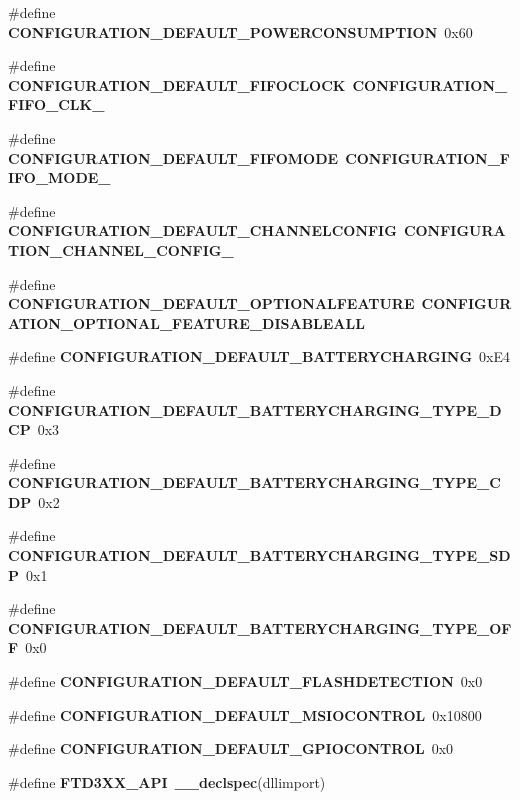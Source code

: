 \begin{DoxyCompactItemize}
\item 
\#define {\bf C\+O\+N\+F\+I\+G\+U\+R\+A\+T\+I\+O\+N\+\_\+\+D\+E\+F\+A\+U\+L\+T\+\_\+\+P\+O\+W\+E\+R\+C\+O\+N\+S\+U\+M\+P\+T\+I\+ON}~0x60
\item 
\#define {\bf C\+O\+N\+F\+I\+G\+U\+R\+A\+T\+I\+O\+N\+\_\+\+D\+E\+F\+A\+U\+L\+T\+\_\+\+F\+I\+F\+O\+C\+L\+O\+CK}~{\bf C\+O\+N\+F\+I\+G\+U\+R\+A\+T\+I\+O\+N\+\_\+\+F\+I\+F\+O\+\_\+\+C\+L\+K\+\_}
\item 
\#define {\bf C\+O\+N\+F\+I\+G\+U\+R\+A\+T\+I\+O\+N\+\_\+\+D\+E\+F\+A\+U\+L\+T\+\_\+\+F\+I\+F\+O\+M\+O\+DE}~{\bf C\+O\+N\+F\+I\+G\+U\+R\+A\+T\+I\+O\+N\+\_\+\+F\+I\+F\+O\+\_\+\+M\+O\+D\+E\+\_}
\item 
\#define {\bf C\+O\+N\+F\+I\+G\+U\+R\+A\+T\+I\+O\+N\+\_\+\+D\+E\+F\+A\+U\+L\+T\+\_\+\+C\+H\+A\+N\+N\+E\+L\+C\+O\+N\+F\+IG}~{\bf C\+O\+N\+F\+I\+G\+U\+R\+A\+T\+I\+O\+N\+\_\+\+C\+H\+A\+N\+N\+E\+L\+\_\+\+C\+O\+N\+F\+I\+G\+\_}
\item 
\#define {\bf C\+O\+N\+F\+I\+G\+U\+R\+A\+T\+I\+O\+N\+\_\+\+D\+E\+F\+A\+U\+L\+T\+\_\+\+O\+P\+T\+I\+O\+N\+A\+L\+F\+E\+A\+T\+U\+RE}~{\bf C\+O\+N\+F\+I\+G\+U\+R\+A\+T\+I\+O\+N\+\_\+\+O\+P\+T\+I\+O\+N\+A\+L\+\_\+\+F\+E\+A\+T\+U\+R\+E\+\_\+\+D\+I\+S\+A\+B\+L\+E\+A\+LL}
\item 
\#define {\bf C\+O\+N\+F\+I\+G\+U\+R\+A\+T\+I\+O\+N\+\_\+\+D\+E\+F\+A\+U\+L\+T\+\_\+\+B\+A\+T\+T\+E\+R\+Y\+C\+H\+A\+R\+G\+I\+NG}~0x\+E4
\item 
\#define {\bf C\+O\+N\+F\+I\+G\+U\+R\+A\+T\+I\+O\+N\+\_\+\+D\+E\+F\+A\+U\+L\+T\+\_\+\+B\+A\+T\+T\+E\+R\+Y\+C\+H\+A\+R\+G\+I\+N\+G\+\_\+\+T\+Y\+P\+E\+\_\+\+D\+CP}~0x3
\item 
\#define {\bf C\+O\+N\+F\+I\+G\+U\+R\+A\+T\+I\+O\+N\+\_\+\+D\+E\+F\+A\+U\+L\+T\+\_\+\+B\+A\+T\+T\+E\+R\+Y\+C\+H\+A\+R\+G\+I\+N\+G\+\_\+\+T\+Y\+P\+E\+\_\+\+C\+DP}~0x2
\item 
\#define {\bf C\+O\+N\+F\+I\+G\+U\+R\+A\+T\+I\+O\+N\+\_\+\+D\+E\+F\+A\+U\+L\+T\+\_\+\+B\+A\+T\+T\+E\+R\+Y\+C\+H\+A\+R\+G\+I\+N\+G\+\_\+\+T\+Y\+P\+E\+\_\+\+S\+DP}~0x1
\item 
\#define {\bf C\+O\+N\+F\+I\+G\+U\+R\+A\+T\+I\+O\+N\+\_\+\+D\+E\+F\+A\+U\+L\+T\+\_\+\+B\+A\+T\+T\+E\+R\+Y\+C\+H\+A\+R\+G\+I\+N\+G\+\_\+\+T\+Y\+P\+E\+\_\+\+O\+FF}~0x0
\item 
\#define {\bf C\+O\+N\+F\+I\+G\+U\+R\+A\+T\+I\+O\+N\+\_\+\+D\+E\+F\+A\+U\+L\+T\+\_\+\+F\+L\+A\+S\+H\+D\+E\+T\+E\+C\+T\+I\+ON}~0x0
\item 
\#define {\bf C\+O\+N\+F\+I\+G\+U\+R\+A\+T\+I\+O\+N\+\_\+\+D\+E\+F\+A\+U\+L\+T\+\_\+\+M\+S\+I\+O\+C\+O\+N\+T\+R\+OL}~0x10800
\item 
\#define {\bf C\+O\+N\+F\+I\+G\+U\+R\+A\+T\+I\+O\+N\+\_\+\+D\+E\+F\+A\+U\+L\+T\+\_\+\+G\+P\+I\+O\+C\+O\+N\+T\+R\+OL}~0x0
\item 
\#define {\bf F\+T\+D3\+X\+X\+\_\+\+A\+PI}~{\bf \+\_\+\+\_\+declspec}(dllimport)
\end{DoxyCompactItemize}
